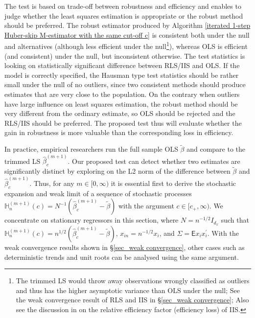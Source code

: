 \documentclass[11pt, letterpaper]{article}
\numberwithin{algorithm}{section}
\numberwithin{assumption}{section}
\numberwithin{lemma}{section}
\numberwithin{theorem}{section}
\numberwithin{corollary}{section}
\numberwithin{remark}{section}
\numberwithin{equation}{section}
\numberwithin{figure}{section}
\numberwithin{table}{section}
\begin{document}
The test is based on trade-off between robustness and efficiency and enables to judge whether the least squares estimation is appropriate or the robust method should be preferred. The robust estimator produced by Algorithm \ref{iterated 1-step Huber-skip M-estimator with the same cut-off c} is consistent both under the null and alternatives (although less efficient under the null\footnote{The trimmed LS would throw away observations wrongly classified as outliers and thus has the higher asymptotic variance than OLS under the null; See the weak convergence result of RLS and IIS in \S \ref{sec_weak convergence}; Also see the discussion in \cite{johansen2009analysis} on the relative efficiency factor (efficiency loss) of IIS.}), whereas OLS is efficient (and consistent) under the null, but inconsistent otherwise. The test statistics is looking on statistically significant difference between RLS/IIS and OLS. If the model is correctly specified, the Hausman type test statistics should be rather small under the null of no outliers, since two consistent methods should produce estimates that are very close to the population. On the contrary when outliers have large influence on least squares estimation, the robust method should be very different from the ordinary estimate, so OLS should be rejected and the RLS/IIS should be preferred. The proposed test thus will evaluate whether the gain in robustness is more valuable than the corresponding loss in efficiency.

In practice, empirical researchers run the full sample OLS $\widetilde{\beta}$ and compare to the trimmed LS $\widehat{\beta}_{c}^{(m + 1)}$. Our proposed test can detect whether two estimates are significantly distinct by exploring on the L2 norm of the difference between $\widetilde{\beta}$ and $\widehat{\beta}_{c}^{(m + 1)}$. Thus, for any $m \in [0, \infty)$ it is essential first to derive the stochastic expansion and weak limit of a sequence of stochastic processes $\mathbb{H}_{n}^{(m + 1)}(c) =N^{-1} (\widehat{\beta}_{c}^{(m + 1)} - \widetilde{\beta})$ with the argument $c \in [c_{+}, \infty)$. We concentrate on stationary regressors in this section, where $N = n^{-1/2} I_{d_{x}}$ such that $\mathbb{H}_{n}^{(m + 1)}(c) =n^{1/2} (\widehat{\beta}_{c}^{(m + 1)} - \widetilde{\beta})$, $x_{in} = n^{-1/2} x_{i}$, and $\Sigma = \mathsf{E} x_{i} x_{i}^{\prime}$. With the weak convergence results shown in \S \ref{sec_weak convergence}, other cases such as deterministic trends and unit roots can be analysed using the same argument.
\end{document}
